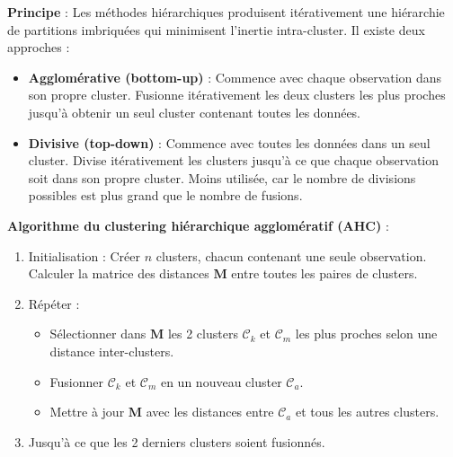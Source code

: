 \documentclass[10pt,a4paper]{article}
\begin{document}
\textbf{Principe} :
Les méthodes hiérarchiques produisent itérativement une hiérarchie de partitions imbriquées qui minimisent l'inertie intra-cluster. Il existe deux approches :
\begin{itemize}
    \item \textbf{Agglomérative (bottom-up)} : Commence avec chaque observation dans son propre cluster. Fusionne itérativement les deux clusters les plus proches jusqu'à obtenir un seul cluster contenant toutes les données.
    \item \textbf{Divisive (top-down)} : Commence avec toutes les données dans un seul cluster. Divise itérativement les clusters jusqu'à ce que chaque observation soit dans son propre cluster. Moins utilisée, car le nombre de divisions possibles est plus grand que le nombre de fusions.
\end{itemize}

\textbf{Algorithme du clustering hiérarchique agglomératif (AHC)} :
\begin{enumerate}
    \item Initialisation : Créer $n$ clusters, chacun contenant une seule observation. Calculer la matrice des distances $\mathbf{M}$ entre toutes les paires de clusters.
    \item Répéter :
    \begin{itemize}
        \item Sélectionner dans $\mathbf{M}$ les 2 clusters $\mathcal{C}_k$ et $\mathcal{C}_m$ les plus proches selon une distance inter-clusters.
        \item Fusionner $\mathcal{C}_k$ et $\mathcal{C}_m$ en un nouveau cluster $\mathcal{C}_a$.
        \item Mettre à jour $\mathbf{M}$ avec les distances entre $\mathcal{C}_a$ et tous les autres clusters.
    \end{itemize}
    \item Jusqu'à ce que les 2 derniers clusters soient fusionnés.
\end{enumerate}
\end{document}
